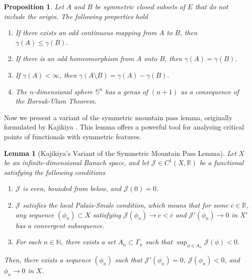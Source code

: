 \documentclass[10pt,a4paper]{amsart}
\numberwithin{equation}{section}
\newtheorem{lemma}[theo]{Lemma}
\newtheorem{proposition}[theo]{Proposition}
\begin{document}
\begin{proposition}\label{prop}
Let $A$ and $B$ be symmetric closed subsets of $E$ that do not include the origin. 
The following properties hold
\begin{enumerate}
\item If there exists an odd continuous mapping from $A$ to $B$, then $\gamma(A)\leq \gamma(B)$.
\item If there is an odd homeomorphism from $A$ onto $B$, then $\gamma(A)= \gamma(B)$.
\item If $\gamma(A)<\infty$, then $\gamma(A\setminus B)=\gamma(A)-\gamma(B)$.
\item The $n$-dimensional sphere $\mathbb{S}^n$ has a genus of $(n+1)$ as a 
consequence of the Borsuk-Ulam Theorem.
\end{enumerate}
\end{proposition}

Now we present a variant of the symmetric mountain pass lemma, originally formulated 
by Kajikiya \cite{n}. This lemma offers a powerful tool for analysing critical points 
of functionals with symmetric features.

\begin{lemma}[Kajikiya's Variant of the Symmetric Mountain Pass Lemma] \label{kajikiya}
Let $X$ be an infinite-dimensional Banach space, and let 
$\mathcal{J}\in C^1(X,\mathbb{R})$ be a functional satisfying the following 
conditions
\begin{enumerate}
\item  $\mathcal{J}$ is even, bounded from below, and $\mathcal{J}(0)=0$.
\item  $\mathcal{J}$ satisfies the local Palais-Smale condition, which means 
 that for some $\overline{c}\in\mathbb{R}$, any sequence $(\phi_n)\subset X$ 
 satisfying $\mathcal{J}(\phi_n)\to c<\overline{c}$ and $\mathcal{J}'(\phi_n)\to 0$ 
 in $X'$ has a convergent subsequence.
\item  For each $n\in \mathbb{N}$, there exists a set $A_n\subset \Gamma_n$ such that 
$\sup_{\phi\in A_n}\mathcal{J}(\phi)<0$.
\end{enumerate}
Then, there exists a sequence $(\phi_n)$ such that $\mathcal{J}'(\phi_n)=0$, 
$\mathcal{J}(\phi_n)<0$, and $\phi_n\to 0$ in $X$.
\end{lemma}
\end{document}
